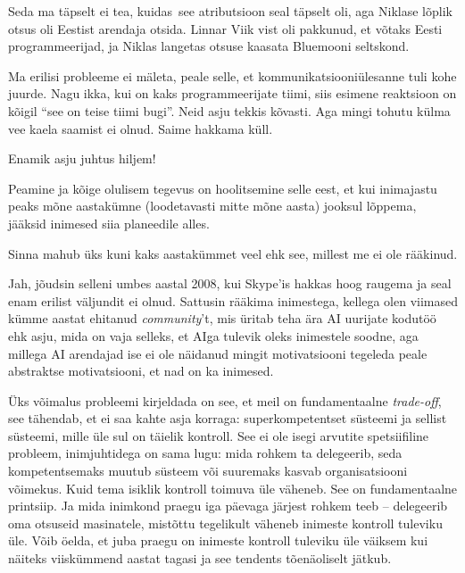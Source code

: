 Seda ma täpselt ei tea, kuidas see atributsioon seal täpselt oli, aga Niklase 
lõplik otsus oli Eestist arendaja otsida. 
Linnar Viik vist oli pakkunud, et võtaks Eesti 
programmeerijad, ja Niklas langetas otsuse kaasata Bluemooni 
seltskond.


Ma erilisi probleeme ei mäleta, peale 
selle, et kommunikatsiooniülesanne tuli kohe juurde. Nagu ikka, kui on kaks 
programmeerijate tiimi, siis esimene reaktsioon on kõigil \enquote{see on 
teise tiimi bugi}. Neid asju tekkis kõvasti. Aga 
mingi tohutu külma vee kaela saamist ei olnud. Saime hakkama küll. 


Enamik asju juhtus hiljem!


Peamine ja kõige olulisem tegevus on hoolitsemine selle eest, et kui 
inimajastu peaks mõne aastakümne (loodetavasti mitte mõne aasta) jooksul 
lõppema, jääksid inimesed siia planeedile alles.


Sinna mahub üks kuni kaks aastakümmet veel ehk see, millest me ei ole 
rääkinud. 


Jah, jõudsin selleni umbes aastal 2008, kui Skype'is hakkas hoog 
raugema ja seal enam erilist väljundit ei olnud. Sattusin rääkima 
inimestega, kellega olen viimased kümme aastat ehitanud 
\emph{community}'t, mis üritab teha ära AI uurijate kodutöö ehk 
asju, mida on vaja selleks, et AIga tulevik oleks inimestele soodne, aga 
millega AI arendajad ise ei ole näidanud mingit motivatsiooni tegeleda peale 
abstraktse motivatsiooni, et nad on ka inimesed.

Üks võimalus probleemi kirjeldada on see, et meil on fundamentaalne 
\emph{trade-off}, see tähendab, et ei saa 
kahte asja korraga: superkompetentset süsteemi ja sellist süsteemi, mille 
üle sul on täielik kontroll. See ei ole isegi arvutite spetsiifiline probleem, 
inimjuhtidega on sama lugu: mida rohkem ta delegeerib, seda 
kompetentsemaks muutub süsteem või suuremaks kasvab organisatsiooni võimekus. 
Kuid tema isiklik kontroll toimuva üle väheneb. See on fundamentaalne 
printsiip. Ja mida inimkond praegu iga päevaga järjest rohkem teeb -- 
delegeerib oma otsuseid masinatele, mistõttu tegelikult 
väheneb inimeste kontroll tuleviku üle. Võib öelda, et juba praegu on inimeste 
kontroll tuleviku üle väiksem kui näiteks viiskümmend aastat tagasi ja see tendents tõenäoliselt jätkub. 

